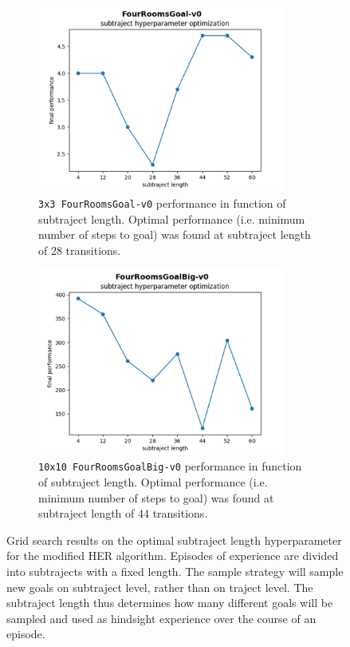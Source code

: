 \documentclass[conference]{IEEEtran}
\begin{document}
\begin{figure}[ht]
\centering
\begin{subfigure}[t]{0.45\textwidth}
\centering
\includegraphics[width=0.9\textwidth]{img/exp_tabular_her_gridsearch_small.png}
\caption{\texttt{3x3 FourRoomsGoal-v0} performance in function of subtraject length. Optimal performance (i.e. minimum number of steps to goal) was found at subtraject length of 28 transitions.}
\label{fig:experiment_subtraject_gridsearch_small}
\end{subfigure}
\hspace{1em}
\begin{subfigure}[t]{0.45\textwidth}
\centering
\includegraphics[width=0.9\textwidth]{img/exp_tabular_her_gridsearch_big.png}
\caption{\texttt{10x10 FourRoomsGoalBig-v0} performance in function of subtraject length. Optimal performance (i.e. minimum number of steps to goal) was found at subtraject length of 44 transitions.}
\label{fig:experiment_subtraject_gridsearch_big}
\end{subfigure}
\caption{Grid search results on the optimal subtraject length hyperparameter for the modified HER algorithm. Episodes of experience are divided into subtrajects with a fixed length. The sample strategy will sample new goals on subtraject level, rather than on traject level. The subtraject length thus determines how many different goals will be sampled and used as hindsight experience over the course of an episode.}
\label{fig:experiment_subtraject_gridsearch}
\end{figure}
\end{document}
